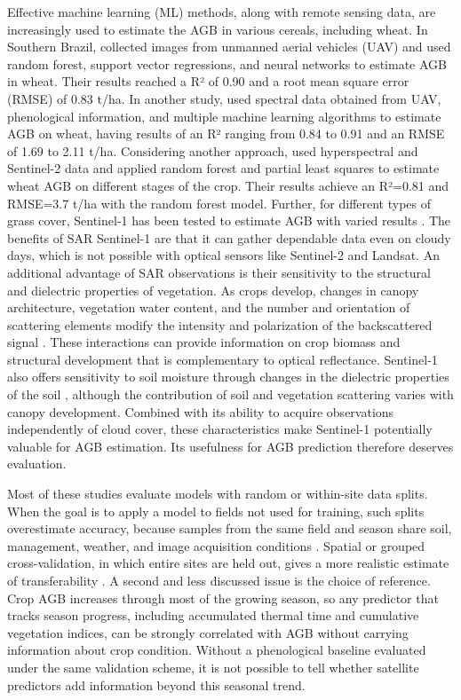 \documentclass[
  english,
  review,
  number,
  sort,compress,
  authoryear,
  3p]{elsarticle}
\begin{document}
Effective machine learning (ML) methods, along with remote sensing data,
are increasingly used to estimate the AGB in various cereals, including
wheat. In Southern Brazil, \citet{AtkinsonAmorim2022} collected images
from unmanned aerial vehicles (UAV) and used random forest, support
vector regressions, and neural networks to estimate AGB in wheat. Their
results reached a R² of 0.90 and a root mean square error (RMSE) of 0.83
t/ha. In another study, \citet{Liu2024} used spectral data obtained from
UAV, phenological information, and multiple machine learning algorithms
to estimate AGB on wheat, having results of an R² ranging from 0.84 to
0.91 and an RMSE of 1.69 to 2.11 t/ha. Considering another approach,
\citet{Marshall2022} used hyperspectral and Sentinel-2 data and applied
random forest and partial least squares to estimate wheat AGB on
different stages of the crop. Their results achieve an R²=0.81 and
RMSE=3.7 t/ha with the random forest model. Further, for different types
of grass cover, Sentinel-1 has been tested to estimate AGB with varied
results \citep{David2022, Li2024, Nuthammachot2022}. The benefits of SAR
Sentinel-1 are that it can gather dependable data even on cloudy days,
which is not possible with optical sensors like Sentinel-2 and Landsat.
An additional advantage of SAR observations is their sensitivity to the
structural and dielectric properties of vegetation. As crops develop,
changes in canopy architecture, vegetation water content, and the number
and orientation of scattering elements modify the intensity and
polarization of the backscattered signal \citep{steele2017radar}. These
interactions can provide information on crop biomass and structural
development that is complementary to optical reflectance. Sentinel-1
also offers sensitivity to soil moisture through changes in the
dielectric properties of the soil \citep{Fan2025, Zhu2024}, although the
contribution of soil and vegetation scattering varies with canopy
development. Combined with its ability to acquire observations
independently of cloud cover, these characteristics make Sentinel-1
potentially valuable for AGB estimation. Its usefulness for AGB
prediction therefore deserves evaluation.

Most of these studies evaluate models with random or within-site data
splits. When the goal is to apply a model to fields not used for
training, such splits overestimate accuracy, because samples from the
same field and season share soil, management, weather, and image
acquisition conditions \citep{Roberts2017, Ploton2020}. Spatial or
grouped cross-validation, in which entire sites are held out, gives a
more realistic estimate of transferability \citep{Meyer2021}. A second
and less discussed issue is the choice of reference. Crop AGB increases
through most of the growing season, so any predictor that tracks season
progress, including accumulated thermal time and cumulative vegetation
indices, can be strongly correlated with AGB without carrying
information about crop condition. Without a phenological baseline
evaluated under the same validation scheme, it is not possible to tell
whether satellite predictors add information beyond this seasonal trend.
\end{document}
